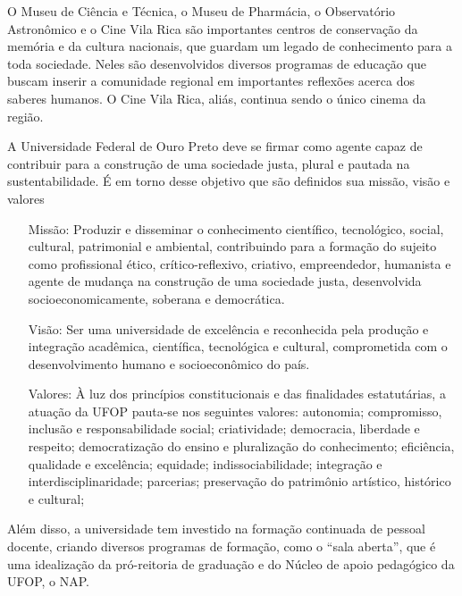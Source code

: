 O Museu de Ciência e Técnica, o Museu de Pharmácia, o Observatório Astronômico e o Cine Vila Rica são importantes centros de conservação da memória e da cultura nacionais, que guardam um legado de conhecimento para a toda sociedade. Neles são desenvolvidos diversos programas de educação que buscam inserir a comunidade regional em importantes reflexões acerca dos saberes humanos. O Cine Vila Rica, aliás, continua sendo o único cinema da região.

A Universidade Federal de Ouro Preto deve se firmar como agente capaz de contribuir para a construção de uma sociedade justa, plural e pautada na sustentabilidade. É em torno desse objetivo que são definidos sua missão, visão e valores
\begin{itemize}
	\item [Missão:] Produzir e disseminar o conhecimento científico, tecnológico, social, cultural, patrimonial e ambiental, contribuindo para a formação do sujeito como profissional ético, crítico-reflexivo, criativo, empreendedor, humanista e agente de mudança na construção de uma sociedade justa, desenvolvida socioeconomicamente, soberana e democrática.
	\item [Visão:] Ser uma universidade de excelência e reconhecida pela produção e integração acadêmica, científica, tecnológica e cultural, comprometida com o desenvolvimento humano e socioeconômico do país.
	\item [Valores:] À luz dos princípios constitucionais e das finalidades estatutárias, a atuação da UFOP pauta-se nos seguintes valores:
	\subitem autonomia;
	\subitem compromisso, inclusão e responsabilidade social;
	\subitem criatividade;
	\subitem democracia, liberdade e respeito;
	\subitem democratização do ensino e pluralização do conhecimento;
	\subitem eficiência, qualidade e excelência;
	\subitem equidade;
	\subitem indissociabilidade;	
	\subitem integração e interdisciplinaridade;
	\subitem parcerias;
	\subitem preservação do patrimônio artístico, histórico e cultural; 
\end{itemize}

Além disso, a universidade tem investido na formação continuada de pessoal docente, criando diversos programas de formação, como o ``sala aberta'', que é uma idealização da pró-reitoria de graduação e do Núcleo de apoio pedagógico da UFOP, o NAP.

